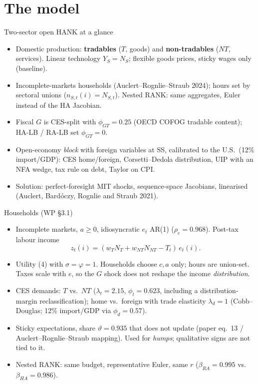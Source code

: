 \documentclass[11pt,aspectratio=169]{beamer}
\begin{document}
\section{The model}
\begin{frame}{Two-sector open HANK at a glance}
  \begin{itemize}
    \item Domestic production: \textbf{tradables} ($T$, goods) and
          \textbf{non-tradables} ($NT$, services). Linear technology
          $Y_S=N_S$; flexible goods prices, sticky wages only (baseline).
    \item Incomplete-markets households (Auclert--Rognlie--Straub 2024);
          hours set by sectoral unions ($n_{S,t}(i)=N_{S,t}$). Nested RANK:
          same aggregates, Euler instead of the HA Jacobian.
    \item Fiscal $G$ is CES-split with $\phi_{GT}=0.25$ (OECD COFOG tradable
          content); HA-LB / RA-LB set $\phi_{GT}=0$.
    \item Open-economy \emph{block} with foreign variables at SS, calibrated
          to the U.S.\ (12\% import/GDP): CES home/foreign, Corsetti--Dedola
          distribution, UIP with an NFA wedge, tax rule on debt, Taylor on CPI.
    \item Solution: perfect-foresight MIT shocks, sequence-space Jacobians,
          linearised (Auclert, Bard\'oczy, Rognlie and Straub 2021).
  \end{itemize}
\end{frame}

\begin{frame}{Households (WP \S3.1)}
  \begin{itemize}
    \item Incomplete markets, $a\ge 0$, idiosyncratic $e_t$ AR(1)
          ($\rho_e=0.968$). Post-tax labour income
          \[
            z_t(i)=(w_T N_T+w_{NT}N_{NT}-T_t)\,e_t(i).
          \]
    \item Utility (4) with $\sigma=\varphi=1$. Households choose $c,a$ only;
          hours are union-set. Taxes scale with $e$, so the $G$ shock does
          not reshape the income \emph{distribution}.
    \item CES demands: $T$ vs.\ $NT$ ($\lambda_t=2.15$, $\phi_t=0.623$,
          including a distribution-margin reclassification);
          home vs.\ foreign with trade elasticity $\lambda_d=1$
          (Cobb--Douglas; 12\% import/GDP via $\phi_d=0.57$).
    \item Sticky expectations, share $\vartheta=0.935$ that does not update
          (paper eq.\ 13 / Auclert--Rognlie--Straub mapping). Used for
          \emph{humps}; qualitative signs are not tied to it.
    \item Nested RANK: same budget, representative Euler, same $r$
          ($\beta_{RA}=0.995$ vs.\ $\beta_{HA}=0.986$).
  \end{itemize}
\end{frame}
\end{document}

